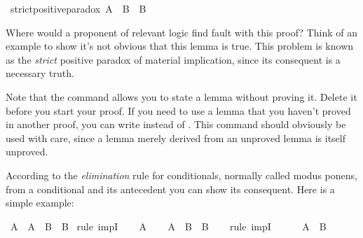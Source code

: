 \begin{isabellebody}
\isamarkupfalse%
\ strict{\isacharunderscore}positive{\isacharunderscore}paradox{\isacharcolon}\ {\isachardoublequoteopen}A\ {\isasymlongrightarrow}\ B\ {\isasymlongrightarrow}\ B{\isachardoublequoteclose}%
\isadelimproof
\ %
\endisadelimproof
%
\isatagproof
{}\isamarkupfalse%
%
\endisatagproof
{\isafoldproof}%
%
\isadelimproof
%
\endisadelimproof
%
\begin{isamarkuptext}%
Where would a proponent of relevant logic find fault with this proof? Think of an example
to show it's not obvious that this lemma is true. This problem is known as the \emph{strict} positive
paradox of material implication, since its consequent  is a necessary truth.%
\end{isamarkuptext}\isamarkuptrue%
%
\begin{isamarkuptext}%
Note that the command  allows you to state a lemma without proving it. Delete 
it before you start your proof. If you need to use a lemma that you haven't proved in another proof, you can
write  instead of . This command should obviously be used with care,
since a lemma merely derived from an unproved lemma is itself unproved.%
\end{isamarkuptext}\isamarkuptrue%
%
\isamarkuptrue%
%
\begin{isamarkuptext}%
According to the \emph{elimination} rule for conditionals, normally called modus ponens,
from a conditional and its antecedent you can show its consequent. Here is a simple example:%
\end{isamarkuptext}\isamarkuptrue%
\isamarkupfalse%
\ {\isachardoublequoteopen}A\ {\isasymlongrightarrow}\ {\isacharparenleft}A\ {\isasymlongrightarrow}\ B{\isacharparenright}\ {\isasymlongrightarrow}\ B{\isachardoublequoteclose}\isanewline
%
\isadelimproof
%
\endisadelimproof
%
\isatagproof
{}\isamarkupfalse%
\ {\isacharparenleft}rule\ impI{\isacharparenright}\isanewline
\ \ \isamarkupfalse%
\ {\isachardoublequoteopen}A{\isachardoublequoteclose}\isanewline
\ \ \isamarkupfalse%
\ {\isachardoublequoteopen}{\isacharparenleft}A\ {\isasymlongrightarrow}\ B{\isacharparenright}\ {\isasymlongrightarrow}\ B{\isachardoublequoteclose}\isanewline
\ \ \isamarkupfalse%
\ {\isacharparenleft}rule\ impI{\isacharparenright}\isanewline
\ \ \ \ \isamarkupfalse%
\ {\isachardoublequoteopen}A\ {\isasymlongrightarrow}\ B{\isachardoublequoteclose}\isanewline

\end{isabellebody}
